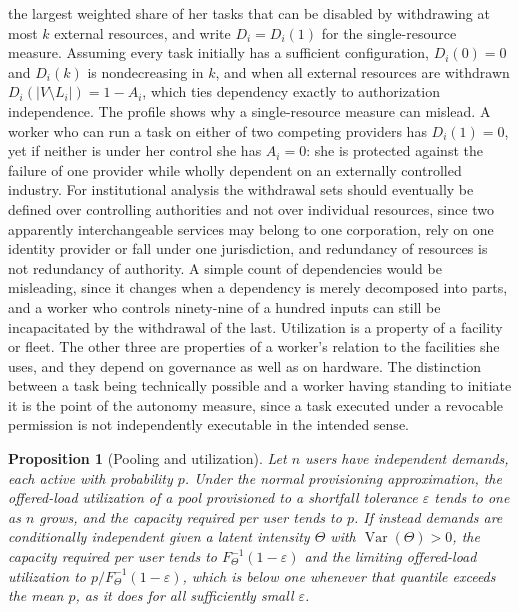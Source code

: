 \documentclass[11pt]{article}
\theoremstyle{plain}
\newtheorem{proposition}{Proposition}
\theoremstyle{definition}
\begin{document}
the largest weighted share of her tasks that can be disabled by withdrawing at most $k$ external resources, and write $D_i=D_i(1)$ for the single-resource measure. Assuming every task initially has a sufficient configuration, $D_i(0)=0$ and $D_i(k)$ is nondecreasing in $k$, and when all external resources are withdrawn $D_i(|V\setminus L_i|)=1-A_i$, which ties dependency exactly to authorization independence. The profile shows why a single-resource measure can mislead. A worker who can run a task on either of two competing providers has $D_i(1)=0$, yet if neither is under her control she has $A_i=0$: she is protected against the failure of one provider while wholly dependent on an externally controlled industry. For institutional analysis the withdrawal sets should eventually be defined over controlling authorities and not over individual resources, since two apparently interchangeable services may belong to one corporation, rely on one identity provider or fall under one jurisdiction, and redundancy of resources is not redundancy of authority. A simple count of dependencies would be misleading, since it changes when a dependency is merely decomposed into parts, and a worker who controls ninety-nine of a hundred inputs can still be incapacitated by the withdrawal of the last. Utilization is a property of a facility or fleet. The other three are properties of a worker's relation to the facilities she uses, and they depend on governance as well as on hardware. The distinction between a task being technically possible and a worker having standing to initiate it is the point of the autonomy measure, since a task executed under a revocable permission is not independently executable in the intended sense.

\begin{proposition}[Pooling and utilization]
Let $n$ users have independent demands, each active with probability $p$. Under the normal provisioning approximation, the offered-load utilization of a pool provisioned to a shortfall tolerance $\varepsilon$ tends to one as $n$ grows, and the capacity required per user tends to $p$. If instead demands are conditionally independent given a latent intensity $\Theta$ with $\operatorname{Var}(\Theta)>0$, the capacity required per user tends to $F_{\Theta}^{-1}(1-\varepsilon)$ and the limiting offered-load utilization to $p/F_{\Theta}^{-1}(1-\varepsilon)$, which is below one whenever that quantile exceeds the mean $p$, as it does for all sufficiently small $\varepsilon$.
\end{proposition}
\end{document}
